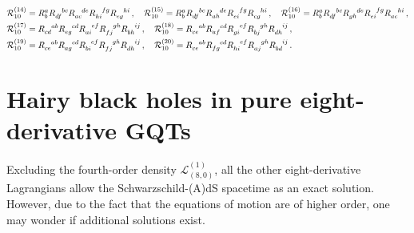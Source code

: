 \documentclass[11pt]{article}
\begin{document}
{\begin{align}
\mathcal{R}_{10}^{(14)} &= R_b^a \tensor{R}{_{df}^{bc}} \tensor{R}{_{ac}^{de}} \tensor{R}{_{hi}^{fg}} \tensor{R}{_{eg}^{hi}} \, ,
\quad 
\mathcal{R}_{10}^{(15)} = R_b^a \tensor{R}{_{df}^{bc}}\tensor{R}{_{ah}^{de}}\tensor{R}{_{ei}^{fg}}\tensor{R}{_{cg}^{hi}} \, ,
\quad 
\mathcal{R}_{10}^{(16)} = R_b^a \tensor{R}{_{df}^{bc}} \tensor{R}{_{gh}^{de}} \tensor{R}{_{ei}^{fg}} \tensor{R}{_{ac}^{hi}} \, ,
\nonumber\\
\mathcal{R}_{10}^{(17)} &= \tensor{R}{_{cd}^{ab}} \tensor{R}{_{eg}^{cd}} \tensor{R}{_{ai}^{ef}} \tensor{R}{_{fj}^{gh}} \tensor{R}{_{bh}^{ij}} \, ,
\quad
\mathcal{R}_{10}^{(18)} = \tensor{R}{_{ce}^{ab}} \tensor{R}{_{af}^{cd}} \tensor{R}{_{gi}^{ef}} \tensor{R}{_{bj}^{gh}} \tensor{R}{_{dh}^{ij}} \, ,
\nonumber\\
\mathcal{R}_{10}^{(19)} &= \tensor{R}{_{ce}^{ab}} \tensor{R}{_{ag}^{cd}} \tensor{R}{_{bi}^{ef}} \tensor{R}{_{fj}^{gh}} \tensor{R}{_{dh}^{ij}} \, ,
\quad
\mathcal{R}_{10}^{(20)} = \tensor{R}{_{ce}^{ab}} \tensor{R}{_{fg}^{cd}} \tensor{R}{_{hi}^{ef}} \tensor{R}{_{aj}^{gh}} \tensor{R}{_{bd}^{ij}} \,  .
\end{align}



\section{Hairy black holes in pure eight-derivative GQTs}\label{8dpure}

Excluding the fourth-order density $\mathcal{L}_{(8,0)}^{(1)}$, all the other eight-derivative Lagrangians allow the Schwarzschild-(A)dS spacetime as an exact solution. However, due to the fact that the equations of motion are of higher order, one may wonder if additional solutions exist. 


}
\end{document}
